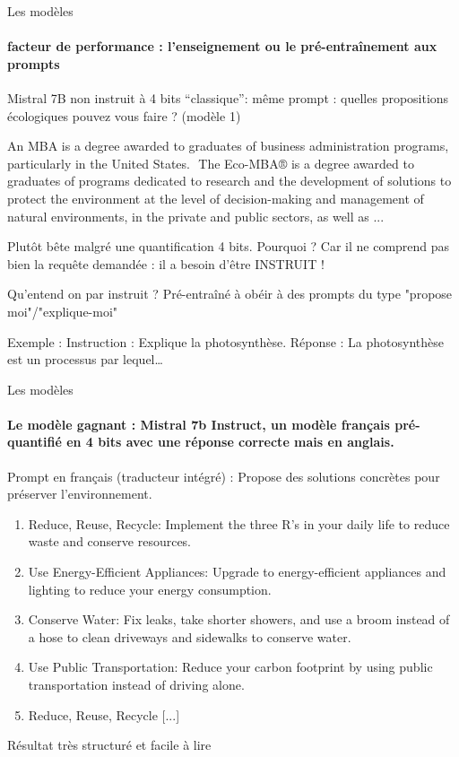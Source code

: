 \documentclass{beamer}
\begin{document}
\begin{frame}{Les modèles}
\framesubtitle{facteur de performance : l’enseignement ou le 
pré-entraînement aux prompts}

Mistral 7B non instruit à 4 bits “classique”: même prompt : quelles propositions écologiques pouvez vous faire ? (modèle 1)

\vspace{0.3cm}

\tiny An MBA is a degree awarded to graduates of business administration programs, particularly in the United States. ​ The Eco-MBA® is a degree awarded to graduates of programs dedicated to research and the development of solutions to protect the environment at the level of decision-making and management of natural environments, in the private and public sectors, as well as ... \newline

\small Plutôt bête malgré une quantification 4 bits. Pourquoi ? Car il ne comprend pas bien la requête demandée : il a besoin d’être INSTRUIT ! \newline 

Qu'entend on par instruit ? Pré-entraîné à obéir à des prompts du type "propose moi"/"explique-moi" \newline 

\begin{block}{Exemple : }
        Instruction : Explique la photosynthèse. Réponse : La photosynthèse est un processus par lequel…
\end{block}

\end{frame}

\begin{frame}{Les modèles}
\framesubtitle{Le modèle gagnant : Mistral 7b Instruct, un modèle français pré-quantifié en 4 bits avec une réponse correcte mais en anglais.}


Prompt en français (traducteur intégré) : Propose des solutions concrètes pour préserver l'environnement.


\begin{enumerate}
    \item Reduce, Reuse, Recycle: Implement the three R's in your daily life to reduce waste and conserve resources.
    \item Use Energy-Efficient Appliances: Upgrade to energy-efficient appliances and lighting to reduce your energy consumption.
    \item Conserve Water: Fix leaks, take shorter showers, and use a broom instead of a hose to clean driveways and sidewalks to conserve water.
    \item Use Public Transportation: Reduce your carbon footprint by using public transportation instead of driving alone.
    \item Reduce, Reuse, Recycle [...]
\end{enumerate}

Résultat très structuré et facile à lire
\end{frame}
\end{document}
